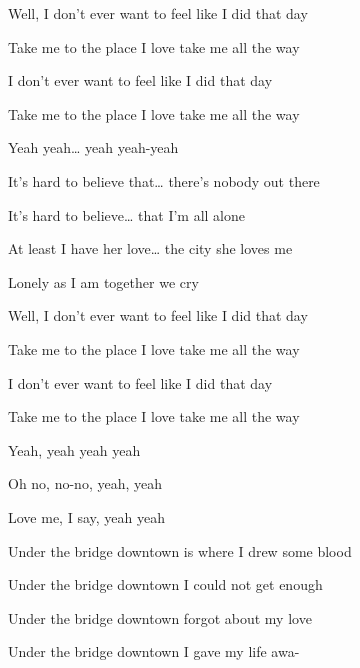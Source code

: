 \begin{song}
\bigskip

Well, I don't ever want to feel  like I did that day \par
{}Take me to the place I love  take me all the way \par
{}I don't ever want to feel  like I did that day \par
{}Take me to the place I love  take me all the way \par
{}Yeah yeah…  yeah yeah-yeah \par
{}    \par

\bigskip

It's hard to believe that… there's nobody out there \par
It's hard to believe… that I'm all alone \par
At least I have her love… the city she loves me \par
{}Lonely as I am together we cry \par
{} \par

\bigskip

Well, I don't ever want to feel  like I did that day \par
{}Take me to the place I love  take me all the way \par
{}I don't ever want to feel  like I did that day \par
{}Take me to the place I love  take me all the way \par
{}Yeah, yeah  yeah yeah \par
{}Oh no, no-no, yeah, yeah \par
{}Love me, I say, yeah yeah \par

\bigskip

   \par

\bigskip

Under the bridge downtown  is where I drew some blood \par
{}Under the bridge downtown  I could not get enough \par
{}Under the bridge downtown  forgot about my love \par
{}Under the bridge downtown  I gave my life awa- \par


\end{song}
